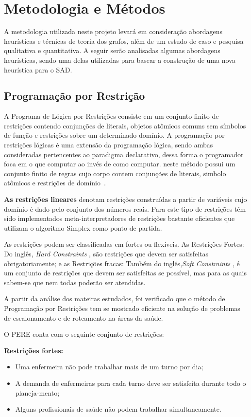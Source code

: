 \section{Metodologia e Métodos}

A metodologia utilizada neste projeto levará em consideração abordagens heurísticas e técnicas de teoria dos grafos, além de um estudo de caso e pesquisa qualitativa e quantitativa.
A seguir serão analisadas algumas abordagens heurísticas, sendo uma delas utilizadas para basear a construção de uma nova heurística para o \ac{SAD}. 

\subsection{Programação por Restrição}

A Programa de Lógica por Restrições consiste em um conjunto finito de restrições contendo conjunções de literais, objetos atômicos comuns sem símbolos de função e restrições sobre um determinado domínio. A programação por restrições lógicas é uma extensão da programação lógica, sendo ambas consideradas pertencentes ao paradigma declarativo, dessa forma o programador foca em o que computar ao invés de como computar. neste método possui um conjunto finito de regras cujo corpo contem conjunções de literais, simbolo atômicos e restrições de domínio~\cite{maria:2008}.

\textbf{As restrições lineares} denotam restrições construídas a partir de variáveis
cujo domínio é dado pelo conjunto dos números reais. Para este tipo de
restrições têm sido implementados meta-interpretadores de restrições bastante
eficientes que utilizam o algoritmo Simplex como ponto de partida.

As restrições podem ser classificadas em fortes ou flexíveis. As Restrições Fortes: Do inglês, \textit{Hard Constraints} , são restrições que devem ser satisfeitas obrigatoriamente; e as Restrições fracas: Também do inglês,\textit{Soft Constraints} , é um conjunto de restrições que devem ser satisfeitas se possível, mas para as quais sabem-se que nem todas poderão ser atendidas.

A partir da análise dos mateiras estudados, foi verificado que o método de Programação por Restrições tem se mostrado eficiente na solução de problemas de escalonamento e de roteamento na áreas da saúde. 

O \ac{PERE} conta com o seguinte conjunto de restrições:

\textbf{Restrições fortes:}
\begin{itemize}
\item Uma enfermeira não pode trabalhar mais de um turno por dia;
\item A demanda de enfermeiras para cada turno deve ser satisfeita durante todo o planeja-mento;
\item Alguns profissionais de saúde não podem trabalhar simultaneamente.
\end{itemize}
 
